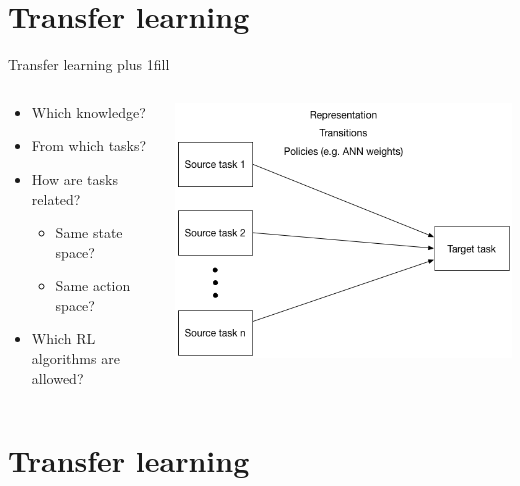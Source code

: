 \documentclass{beamer}
\begin{document}
\section{Transfer learning}
\begin{frame}[fragile]{Transfer learning}
\vskip0pt plus 1fill
\begin{columns}
\begin{column}{0.4\textwidth}
\begin{itemize}
    \item Which knowledge?
    \item From which tasks?
    \item How are tasks related?
    \begin{itemize}
        \item Same state space?
        \item Same action space?
    \end{itemize}
    \item Which RL algorithms are allowed?
\end{itemize}
\end{column}
    \begin{column}{0.6\textwidth}
    \includegraphics[width=\linewidth]{transfer_learning}
    \end{column}
\end{columns}
\begin{center}
\end{center}
\end{frame}

\section{Transfer learning}
\end{document}
